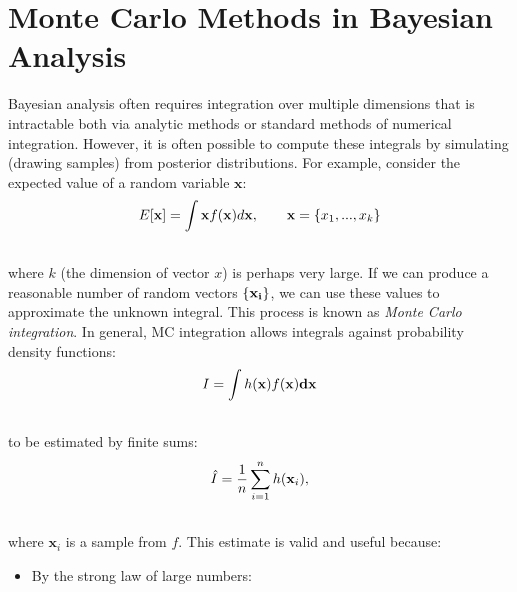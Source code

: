 \documentclass[letterpaper,10pt,english]{sphinxmanual}
\begin{document}
\section{Monte Carlo Methods in Bayesian Analysis}
\label{theory:monte-carlo-methods-in-bayesian-analysis}
Bayesian analysis often requires integration over multiple dimensions that is intractable both via analytic methods or standard methods of numerical integration. However, it is often possible to compute these integrals by simulating (drawing samples) from posterior distributions. For example, consider the expected value of a random variable $\mathbf{x}$:
\begin{gather}
\begin{split}E[{\bf x}] = \int {\bf x} f({\bf x}) d{\bf x}, \qquad
{\bf x} = \{x_1,...,x_k\}\end{split}\notag\\\begin{split}\end{split}\notag
\end{gather}
where $k$ (the dimension of vector $x$) is perhaps very large. If we can produce a reasonable number of random vectors $\{{\bf x_i}\}$, we can use these values to approximate the unknown integral. This process is known as \emph{Monte Carlo integration}. In general, MC integration allows integrals against probability density functions:
\begin{gather}
\begin{split}I = \int h(\mathbf{x}) f(\mathbf{x}) \mathbf{dx}\end{split}\notag\\\begin{split}\end{split}\notag
\end{gather}
to be estimated by finite sums:
\begin{gather}
\begin{split}\hat{I} = \frac{1}{n}\sum_{i=1}^n h(\mathbf{x}_i),\end{split}\notag\\\begin{split}\end{split}\notag
\end{gather}
where $\mathbf{x}_i$ is a sample from $f$. This estimate is valid and useful because:
\begin{itemize}
\item {} 
By the strong law of large numbers:

\end{itemize}
\end{document}
